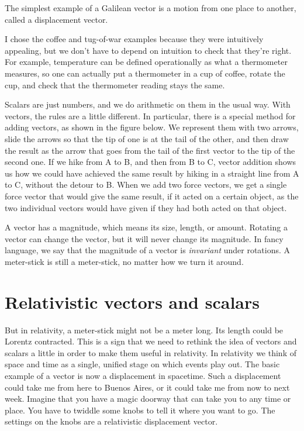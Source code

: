 
The simplest example of a Galilean vector is a motion from one place to another,
called a displacement vector.

I chose the coffee and tug-of-war examples because they were intuitively appealing,
but we don't have to depend on intuition to check that they're right. For example,
temperature can be defined operationally as what a thermometer measures, so one can actually
put a thermometer in a cup of coffee, rotate the cup, and check that the thermometer reading
stays the same.

Scalars are just numbers, and we do arithmetic on them in the usual way.
With vectors, the rules are a little different. In particular, there is
a special method for adding vectors, as shown in the figure below. We represent
them with two arrows, slide the arrows so that the tip of one is at the tail
of the other, and then draw the result as the arrow that goes from the tail
of the first vector to the tip of the second one. If we hike from A to B, and then
from B to C, vector addition shows us how we could have achieved the same result
by hiking in a straight line from A to C, without the detour to B. When we add
two force vectors, we get a single force vector that would give the same result,
if it acted on a certain object, as the two individual vectors would have given
if they had both acted on that object.


A vector has a magnitude, which means its size, length, or amount. Rotating a vector
can change the vector, but it will never change its magnitude.
In fancy language, we say that the magnitude of a vector is \emph{invariant} under rotations.
A meter-stick is
still a meter-stick, no matter how we turn it around.

\section{Relativistic vectors and scalars}

But in relativity, a meter-stick might not be a meter long. Its length could be Lorentz contracted.
This is a sign that we need to rethink the idea of vectors and scalars a little in order to make
them useful in relativity. In relativity we think of space and time as a single, unified stage
on which events play out. The basic example of a vector is now a displacement in spacetime.
Such a displacement could take me from here to Buenos Aires, or it could take me from now to next week.
Imagine that you have a magic doorway that can take you to any time or place. You have to twiddle some
knobs to tell it where you want to go. The settings on the knobs are a relativistic displacement vector.

